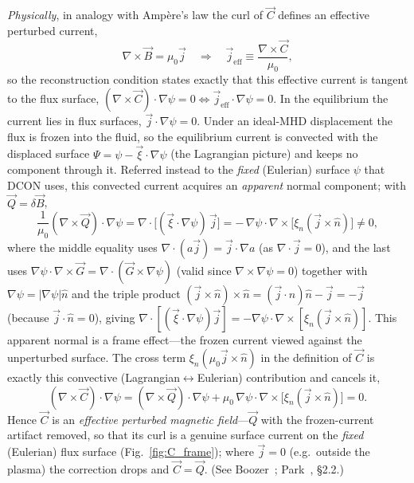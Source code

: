 \documentclass[10pt,a4paper]{article}
\numberwithin{equation}{section}
\begin{document}
\emph{Physically}, in analogy with Amp\`ere's law the curl of $\vec C$ defines an effective
perturbed current,
\begin{equation}
\nabla\times\vec B=\mu_0\vec j
\quad\Longrightarrow\quad
\vec j_{\mathrm{eff}}\equiv\frac{\nabla\times\vec C}{\mu_0},
\end{equation}
so the reconstruction condition states exactly that this effective current is tangent to the
flux surface, $(\nabla\times\vec C)\cdot\nabla\psi=0\Leftrightarrow\vec j_{\mathrm{eff}}\cdot\nabla\psi=0$. In the equilibrium the current
lies in flux surfaces, $\vec j\cdot\nabla\psi=0$. Under an ideal-MHD displacement the flux
is frozen into the fluid, so the equilibrium current is convected with the displaced surface
$\Psi=\psi-\vec\xi\cdot\nabla\psi$ (the Lagrangian picture) and keeps no component through it.
Referred instead to the \emph{fixed} (Eulerian) surface $\psi$ that DCON uses, this convected
current acquires an \emph{apparent} normal component; with $\vec Q=\delta\vec B$,
\begin{equation}
\frac{1}{\mu_0}(\nabla\times\vec Q)\cdot\nabla\psi
=\nabla\cdot\!\big[(\vec\xi\cdot\nabla\psi)\,\vec j\big]
=-\,\nabla\psi\cdot\nabla\times\!\big[\xi_n(\vec j\times\hat n)\big]\neq0,
\end{equation}
where the middle equality uses $\nabla\cdot(a\vec j)=\vec j\cdot\nabla a$ (as
$\nabla\cdot\vec j=0$), and the last uses $\nabla\psi\cdot\nabla\times\vec G=\nabla\cdot(\vec G\times\nabla\psi)$
(valid since $\nabla\times\nabla\psi=0$) together with $\nabla\psi=|\nabla\psi|\hat n$ and the
triple product $(\vec j\times\hat n)\times\hat n=(\vec j\cdot\hat n)\hat n-\vec j=-\vec j$
(because $\vec j\cdot\hat n=0$), giving
$\nabla\cdot[(\vec\xi\cdot\nabla\psi)\vec j]=-\nabla\psi\cdot\nabla\times[\xi_n(\vec j\times\hat n)]$.
This apparent normal is a frame effect---the frozen current viewed against the unperturbed
surface. The cross term $\xi_n(\mu_0\vec j\times\hat n)$ in the definition of $\vec C$ is
exactly this convective (Lagrangian$\leftrightarrow$Eulerian) contribution and cancels it,
\begin{equation}
(\nabla\times\vec C)\cdot\nabla\psi
=(\nabla\times\vec Q)\cdot\nabla\psi
+\mu_0\,\nabla\psi\cdot\nabla\times\!\big[\xi_n(\vec j\times\hat n)\big]=0.
\end{equation}
Hence $\vec C$ is an \emph{effective perturbed magnetic field}---$\vec Q$ with the
frozen-current artifact removed, so that its curl is a genuine surface current on the
\emph{fixed} (Eulerian) flux surface (Fig.~\ref{fig:C_frame}); where $\vec j=0$ (e.g.\ outside the plasma) the
correction drops and $\vec C=\vec Q$. (See Boozer~\cite{RevModPhys.76.1071};
Park~\cite{Park2009Ideal}, \S2.2.)
\end{document}

